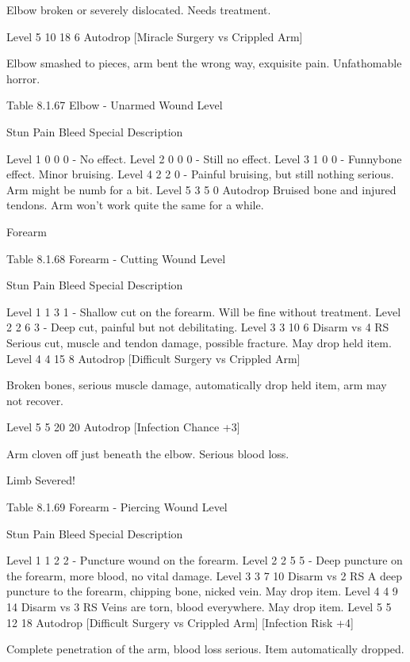 \documentclass[oneside,11pt,english]{book}
\begin{document}
Elbow broken or severely dislocated. Needs 
treatment. 

Level 5 10 18 6 Autodrop [Miracle 
Surgery vs Crippled Arm] 

Elbow smashed to pieces, arm bent the wrong 
way, exquisite pain. Unfathomable horror. 

 
Table 8.1.67 Elbow - Unarmed 
Wound 
Level 

Stun Pain Bleed Special Description 

Level 1 0 0 0 - No effect. 
Level 2 0 0 0 - Still no effect. 
Level 3 1 0 0 - Funnybone effect. Minor bruising. 
Level 4 2 2 0 - Painful bruising, but still nothing serious. Arm might be numb 
for a bit. 
Level 5 3 5 0 Autodrop Bruised bone and injured tendons. Arm won’t work quite the 
same for a while. 

 

 

Forearm 

 

Table 8.1.68 Forearm - Cutting 
Wound 
Level 

Stun Pain Bleed Special Description 

Level 1 1 3 1 - Shallow cut on the forearm. Will be fine without 
treatment. 
Level 2 2 6 3 - Deep cut, painful but not debilitating. 
Level 3 3 10 6 Disarm vs 4 RS Serious cut, muscle and tendon damage, possible 
fracture. May drop held item. 
Level 4 4 15 8 Autodrop 
[Difficult Surgery vs 
Crippled Arm] 

Broken bones, serious muscle damage, automatically 
drop held item, arm may not recover. 

Level 5 5 20 20 Autodrop 
[Infection Chance +3] 

Arm cloven off just beneath the elbow. Serious blood 
loss. 


Limb Severed! 

 
Table 8.1.69 Forearm - Piercing 
Wound 
Level 

Stun Pain Bleed Special Description 

Level 1 1 2 2 - Puncture wound on the forearm. 
Level 2 2 5 5 - Deep puncture on the forearm, more blood, 
no vital damage. 
Level 3 3 7 10 Disarm vs 2 RS A deep puncture to the forearm, chipping 
bone, nicked vein. May drop item. 
Level 4 4 9 14 Disarm vs 3 RS Veins are torn, blood everywhere. May drop 
item. 
Level 5 5 12 18 Autodrop 
[Difficult Surgery vs Crippled 
Arm] [Infection Risk +4] 

Complete penetration of the arm, blood loss 
serious. Item automatically dropped. 
\end{document}

